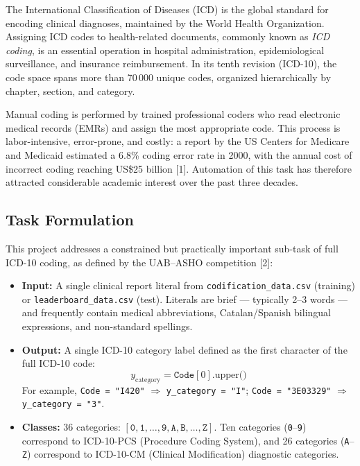 \documentclass[10pt,a4paper,twocolumn]{article}
\begin{document}
The International Classification of Diseases (ICD) is the global standard for
encoding clinical diagnoses, maintained by the World Health Organization. Assigning
ICD codes to health-related documents, commonly known as \textit{ICD coding}, is
an essential operation in hospital administration, epidemiological surveillance,
and insurance reimbursement. In its tenth revision (ICD-10), the code space spans
more than 70\,000 unique codes, organized hierarchically by chapter, section, and
category.

Manual coding is performed by trained professional coders who read electronic
medical records (EMRs) and assign the most appropriate code. This process is
labor-intensive, error-prone, and costly: a report by the US Centers for Medicare
and Medicaid estimated a 6.8\% coding error rate in 2000, with the annual cost of
incorrect coding reaching US\$25 billion [1]. Automation of this task has therefore
attracted considerable academic interest over the past three decades.

\subsection{Task Formulation}

This project addresses a constrained but practically important sub-task of full
ICD-10 coding, as defined by the UAB--ASHO competition [2]:

\begin{itemize}
  \item \textbf{Input:} A single clinical report literal from
        \texttt{codification\_data.csv} (training) or
        \texttt{leaderboard\_data.csv} (test). Literals are brief --- typically
        2--3 words --- and frequently contain medical abbreviations, Catalan/Spanish
        bilingual expressions, and non-standard spellings.
  \item \textbf{Output:} A single ICD-10 category label defined as the first
        character of the full ICD-10 code:
        \begin{equation}
          y_{\text{category}} = \texttt{Code}[0].\text{upper()}
        \end{equation}
        For example, \texttt{Code = "I420"} $\Rightarrow$ \texttt{y\_category = "I"};
        \texttt{Code = "3E03329"} $\Rightarrow$ \texttt{y\_category = "3"}.
  \item \textbf{Classes:} 36 categories: $[\texttt{0}, \texttt{1}, \ldots, \texttt{9},
        \texttt{A}, \texttt{B}, \ldots, \texttt{Z}]$. Ten categories (\texttt{0}--\texttt{9})
        correspond to ICD-10-PCS (Procedure Coding System), and 26 categories
        (\texttt{A}--\texttt{Z}) correspond to ICD-10-CM (Clinical Modification)
        diagnostic categories.
\end{itemize}
\end{document}
